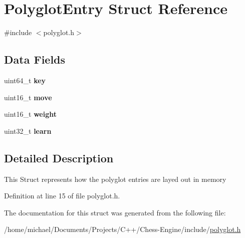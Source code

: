 \hypertarget{structPolyglotEntry}{}\section{Polyglot\+Entry Struct Reference}
\label{structPolyglotEntry}


{\ttfamily \#include $<$polyglot.\+h$>$}

\subsection*{Data Fields}
\begin{DoxyCompactItemize}
\item 
\mbox{\label{structPolyglotEntry_a12350fd6b30d536f5d8e74609a3abd58}} 
uint64\+\_\+t {\bfseries key}
\item 
\mbox{\label{structPolyglotEntry_a3d90c2490525d9c08b55256ebc866add}} 
uint16\+\_\+t {\bfseries move}
\item 
\mbox{\label{structPolyglotEntry_abcf293aaf15fdb22e5ce7fcccb58ba66}} 
uint16\+\_\+t {\bfseries weight}
\item 
\mbox{\label{structPolyglotEntry_a7fa0bafee890ac8d309a1d1daa15d962}} 
uint32\+\_\+t {\bfseries learn}
\end{DoxyCompactItemize}


\subsection{Detailed Description}
This Struct represents how the polyglot entries are layed out in memory 

Definition at line 15 of file polyglot.\+h.



The documentation for this struct was generated from the following file\+:\begin{DoxyCompactItemize}
\item 
/home/michael/\+Documents/\+Projects/\+C++/\+Chess-\/\+Engine/include/\mbox{\hyperlink{polyglot_8h}{polyglot.\+h}}\end{DoxyCompactItemize}
